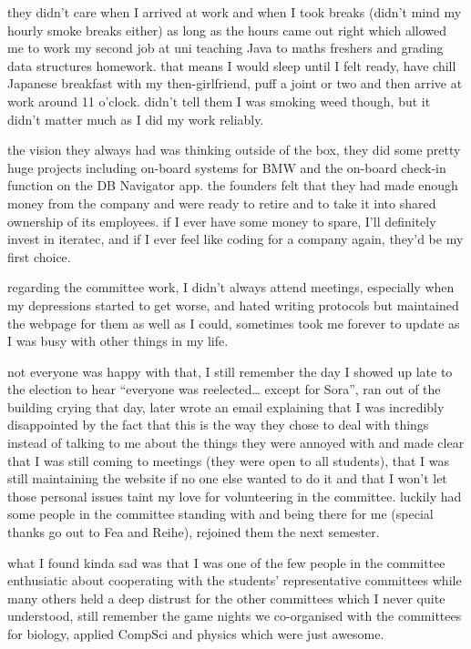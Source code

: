 \documentclass[12pt]{report}
\theoremstyle{definition}
\theoremstyle{remark}
\begin{document}
they didn't care when I arrived at work and when I took breaks (didn't mind my hourly smoke breaks either) as long as the hours came out right which allowed me to work my second job at uni teaching Java to maths freshers and grading data structures homework. that means I would sleep until I felt ready, have chill Japanese breakfast with my then-girlfriend, puff a joint or two and then arrive at work around 11 o'clock. didn't tell them I was smoking weed though, but it didn't matter much as I did my work reliably.

the vision they always had was thinking outside of the box, they did some pretty huge projects including on-board systems for BMW and the on-board check-in function on the DB Navigator app. the founders felt that they had made enough money from the company and were ready to retire and to take it into shared ownership of its employees. if I ever have some money to spare, I'll definitely invest in iteratec, and if I ever feel like coding for a company again, they'd be my first choice.

regarding the committee work, I didn't always attend meetings, especially when my depressions started to get worse, and hated writing protocols but maintained the webpage for them as well as I could, sometimes took me forever to update as I was busy with other things in my life.

not everyone was happy with that, I still remember the day I showed up late to the election to hear ``everyone was reelected… except for Sora'', ran out of the building crying that day, later wrote an email explaining that I was incredibly disappointed by the fact that this is the way they chose to deal with things instead of talking to me about the things they were annoyed with and made clear that I was still coming to meetings (they were open to all students), that I was still maintaining the website if no one else wanted to do it and that I won't let those personal issues taint my love for volunteering in the committee. luckily had some people in the committee standing with and being there for me (special thanks go out to Fea and Reihe), rejoined them the next semester.

what I found kinda sad was that I was one of the few people in the committee enthusiatic about cooperating with the students' representative committees while many others held a deep distrust for the other committees which I never quite understood, still remember the game nights we co-organised with the committees for biology, applied CompSci and physics which were just awesome.
\end{document}
